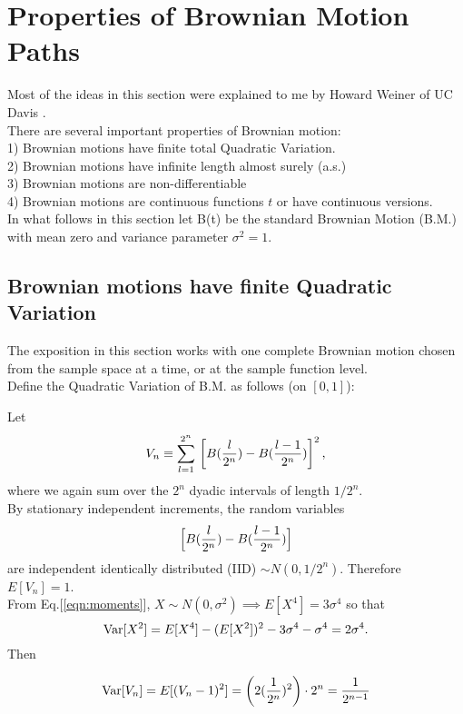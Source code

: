 \section{Properties of Brownian Motion Paths}
\label{sec:Brownian}

Most of the ideas in this section were explained to me by Howard Weiner of UC Davis \cite{Weiner1}.\\

There are several important properties of Brownian motion:\\

1) Brownian motions have finite total Quadratic Variation.\\
2) Brownian motions have infinite length almost surely (a.s.) \\
3) Brownian motions are non-differentiable \\
4) Brownian motions are continuous functions $t$ or have continuous versions.\\

In what follows in this section let B(t) be the standard Brownian Motion (B.M.) with mean zero and variance parameter $\sigma^2 = 1$.\\

\subsection{Brownian motions have finite Quadratic Variation}

The exposition in this section works with one complete Brownian motion chosen from the sample space at a time, or at the sample function level. \\

Define the Quadratic Variation of B.M. as follows (on $[0,1]$):

Let $$V_n \equiv \sum_{l=1}^{2^n}\, \left[ B({l\over2^n}) - B({l-1\over2^n})\right]^2,$$ where we again sum over the $2^n$ dyadic intervals of length $1/2^n$.\\

By stationary independent increments, the random variables $$\Big[ B({l\over2^n}) - B({l-1\over2^n}) \Big]$$ are independent identically distributed (IID) $\sim N(0,1/2^n)$. Therefore $E[V_n] = 1$.\\

From Eq.[\ref{eqn:moments}], $X\sim N(0,\sigma^2) \implies E[X^4] = 3\sigma^4$ so that $$\hbox{Var}[X^2] = E[X^4] - (E[X^2])^2 - 3\sigma^4 - \sigma^4 = 2\sigma^4.$$ Then 

$$\hbox{Var}[V_n] = E[(V_n - 1)^2] = \left(2({1\over2^n})^2\right) \cdot 2^n = {1\over2^{n-1}}$$ 

